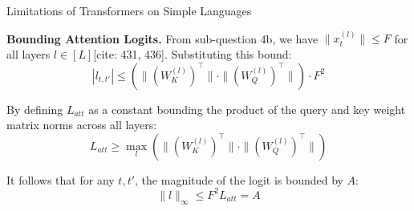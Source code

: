 \begin{question}{Limitations of Transformers on Simple Languages}
\begin{subquestion}{\textbf{Bounding Attention Logits.}}
    From sub-question 4b, we have $\|x_t^{(l)}\| \le F$ for all layers $l \in [L]$[cite: 431, 436]. Substituting this bound:
    \begin{equation}
    |l_{t, t'}| \le (\|(W_K^{(l)})^\top\| \cdot \|(W_Q^{(l)})^\top\|) \cdot F^2
    \end{equation}

    By defining $L_{att}$ as a constant bounding the product of the query and key weight matrix norms across all layers:
    \begin{equation}
    L_{att} \ge \max_{l} (\|(W_K^{(l)})^\top\| \cdot \|(W_Q^{(l)})^\top\|)
    \end{equation}

    It follows that for any $t, t'$, the magnitude of the logit is bounded by $A$:
    \begin{equation}
    \|l\|_{\infty} \le F^2 L_{att} = A
    \end{equation}

\end{subquestion}

\begin{subquestion}

\end{subquestion}

\begin{subquestion}

\end{subquestion}

\begin{subquestion}

\end{subquestion}

\begin{subquestion}

\end{subquestion}

\begin{subquestion}

\end{subquestion}

\end{question}